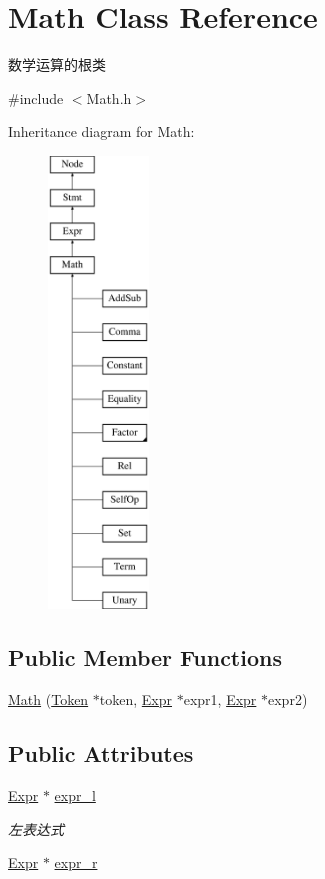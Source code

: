 \hypertarget{class_math}{}\section{Math Class Reference}
\label{class_math}


数学运算的根类  




{\ttfamily \#include $<$Math.\+h$>$}

Inheritance diagram for Math\+:\begin{figure}[H]
\begin{center}
\leavevmode
\includegraphics[height=12.000000cm]{class_math}
\end{center}
\end{figure}
\subsection*{Public Member Functions}
\begin{DoxyCompactItemize}
\item 
\hyperlink{class_math_af045a09f80d73b385d902041bc5cf41e}{Math} (\hyperlink{class_token}{Token} $\ast$token, \hyperlink{class_expr}{Expr} $\ast$expr1, \hyperlink{class_expr}{Expr} $\ast$expr2)
\end{DoxyCompactItemize}
\subsection*{Public Attributes}
\begin{DoxyCompactItemize}
\item 
\hyperlink{class_expr}{Expr} $\ast$ \hyperlink{class_math_a551d177c9245212a8b5374ea1e4024ea}{expr\+\_\+l}
\begin{DoxyCompactList}\small\item\em 左表达式 \end{DoxyCompactList}\item 
\hyperlink{class_expr}{Expr} $\ast$ \hyperlink{class_math_a2e2eb1f4f47fd10466db783b20183307}{expr\+\_\+r}
\end{DoxyCompactItemize}
